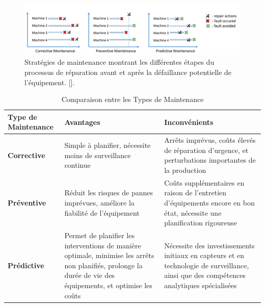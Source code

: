 \begin{figure}[hbt!]
	\centering
	\includegraphics[width=12cm]{images_pfe/predictive.png}
	\caption{Stratégies de maintenance montrant les différentes étapes du processus de réparation avant et après la défaillance potentielle de l'équipement. [\cite{Mrozek2023}].}
	\label{fig:transformer}
\end{figure}
\FloatBarrier

\begin{table}[h]
	\centering
	\begin{tabular}{|l|p{5cm}|p{5cm}|}
		\hline
		\textbf{Type de Maintenance} & \textbf{Avantages}                                                                                                                                            & \textbf{Inconvénients}                                                                                                                   \\
		\hline
		\textbf{Corrective}          & Simple à planifier, nécessite moins de surveillance continue                                                                                                  & Arrêts imprévus, coûts élevés de réparation d’urgence, et perturbations importantes de la production                                     \\
		\hline
		\textbf{Préventive}          & Réduit les risques de pannes imprévues, améliore la fiabilité de l’équipement                                                                                 & Coûts supplémentaires en raison de l’entretien d’équipements encore en bon état, nécessite une planification rigoureuse                  \\
		\hline
		\textbf{Prédictive}          & Permet de planifier les interventions de manière optimale, minimise les arrêts non planifiés, prolonge la durée de vie des équipements, et optimise les coûts & Nécessite des investissements initiaux en capteurs et en technologie de surveillance, ainsi que des compétences analytiques spécialisées \\
		\hline
	\end{tabular}
	\caption{Comparaison entre les Types de Maintenance}
	\label{tab:comparaison-maintenance}
\end{table}

